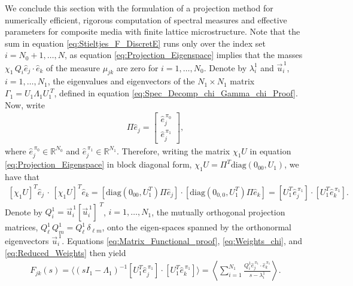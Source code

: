 \documentclass{cmslatex}
\begin{document}
We conclude this section with the formulation of a projection method
for numerically efficient, rigorous computation of spectral
measures and effective parameters for composite media with finite
lattice microstructure. Note that the sum in equation 
\eqref{eq:Stieltjes_F_DiscretE} runs only over the index set
$i=N_0+1,\ldots,N$, as equation \eqref{eq:Projection_Eigenspace} implies
that the masses $\chi_1\,Q_i\hat{e}_j\cdot\hat{e}_k$ of the measure $\mu_{jk}$
are zero for $i=1,\ldots,N_0$.  Denote by $\lambda_i^1$ and $\vec{u}_i^{\,1}$,
$i=1,\ldots,N_1$, the eigenvalues and eigenvectors of the $N_1\times N_1$
matrix $\Gamma_1=U_1\Lambda_1U_1^{\;T} $, defined in equation
\eqref{eq:Spec_Decomp_chi_Gamma_chi_Proof}. Now, write       
%
\begin{align}\label{Pi_coordinates_E}
\Pi\hat{e}_j=
  \left[
  \begin{array}{ccc}
    \hat{e}_j^{\,\pi_0}\\
    \hat{e}_j^{\,\pi_1}
    \end{array}
\right],
\end{align}
%
where $\hat{e}_j^{\,\pi_0}\in\mathbb{R}^{N_0}$ and
$\hat{e}_j^{\,\pi_1}\in\mathbb{R}^{N_1}$. Therefore, writing the
matrix $\chi_1U$ in equation \eqref{eq:Projection_Eigenspace} in block
diagonal form, $\chi_1U=\Pi^T\text{diag}(0_{00},U_1)$, we have that
%
\begin{align}\label{eq:Reduced_Weights}
  [\chi_1U]^T\hat{e}_j\,\cdot\,[\chi_1U]^T\hat{e}_k=[\text{diag}(0_{00},U_1^T)\Pi\hat{e}_j]
                                    \cdot[\text{diag}(0_{0,0},U_1^T)\Pi\hat{e}_k]
                                   =[U_1^T\hat{e}_j^{\,\pi_1}]
                                   \cdot[U_1^T\hat{e}_k^{\,\pi_1}]. 
\end{align}
%
Denote by $Q^1_i=\vec{u}^{\,1}_i[\vec{u}^{\,1}_i]^{\;T}$, $i=1,\ldots,N_1$,
the mutually orthogonal projection matrices,
$Q^1_\ell\,Q^1_m=Q^1_\ell\,\delta_{\ell m}$, onto the eigen-spaces spanned by the
orthonormal eigenvectors $\vec{u}^{\,1}_i$. Equations
\eqref{eq:Matrix_Functional_proof}, \eqref{eq:Weights_chi}, and
\eqref{eq:Reduced_Weights} then yield    
%
\begin{align}\label{eq:Fs_U1}
  F_{jk}(s)=\langle(sI_1-\Lambda_1)^{-1}[U_1^T\hat{e}_j^{\,\pi_1}]
                       \cdot[U_1^T\hat{e}_k^{\,\pi_1}]\rangle
          =\left\langle\sum_{i=1}^{N_1} 
          \frac{Q^1_i\hat{e}_j^{\,\pi_1}\cdot\hat{e}_k^{\,\pi_1}                
              }{s-\lambda_i^1}
              \right\rangle.        
\end{align}
%
\end{document}
